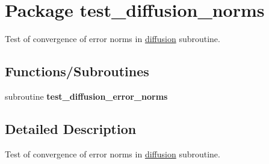 \hypertarget{a00081}{
\section{Package test\_\-diffusion\_\-norms}
\label{a00081}
}
Test of convergence of error norms in \hyperlink{a00056}{diffusion} subroutine.  


\subsection*{Functions/Subroutines}
\begin{CompactItemize}
\item 
\hypertarget{a00081_652cfc18202746580eeb8f3e22facea9}{
subroutine \textbf{test\_\-diffusion\_\-error\_\-norms}}
\label{a00081_652cfc18202746580eeb8f3e22facea9}

\end{CompactItemize}


\subsection{Detailed Description}
Test of convergence of error norms in \hyperlink{a00056}{diffusion} subroutine. 

